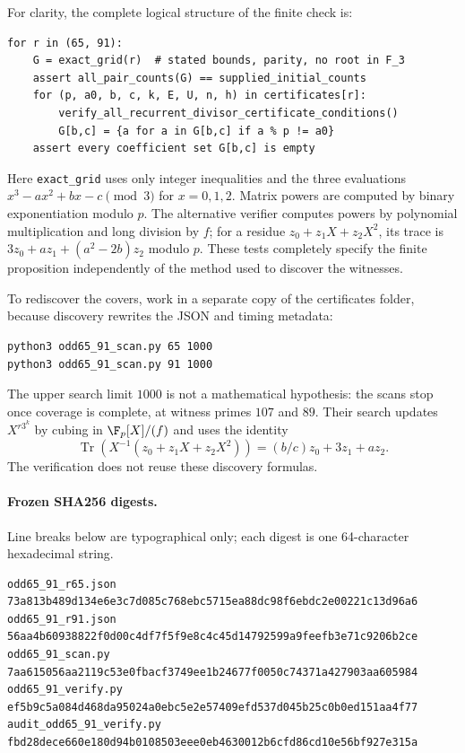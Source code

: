 \documentclass[11pt,a4paper]{article}
\theoremstyle{definition}\newtheorem{definition}[theorem]{Definition}
\theoremstyle{remark}\newtheorem{remark}[theorem]{Remark}
\DeclareMathOperator{\Tr}{Tr}\DeclareMathOperator{\tr}{tr}\DeclareMathOperator{\Nm}{N}
\begin{document}
For clarity, the complete logical structure of the finite check is:
\begin{lstlisting}
for r in (65, 91):
    G = exact_grid(r)  # stated bounds, parity, no root in F_3
    assert all_pair_counts(G) == supplied_initial_counts
    for (p, a0, b, c, k, E, U, n, h) in certificates[r]:
        verify_all_recurrent_divisor_certificate_conditions()
        G[b,c] = {a for a in G[b,c] if a % p != a0}
    assert every coefficient set G[b,c] is empty
\end{lstlisting}
Here \texttt{exact\_grid} uses only integer inequalities and the
three evaluations $x^3-ax^2+bx-c\pmod3$ for $x=0,1,2$.
Matrix powers are computed by binary exponentiation modulo $p$.
The alternative verifier computes powers by polynomial multiplication
and long division by $f$; for a residue $z_0+z_1X+z_2X^2$, its trace is
$3z_0+az_1+(a^2-2b)z_2$ modulo $p$.
These tests completely specify the finite proposition independently
of the method used to discover the witnesses.

To rediscover the covers, work in a separate copy of the certificates
folder, because discovery rewrites the JSON and timing metadata:
\begin{lstlisting}
python3 odd65_91_scan.py 65 1000
python3 odd65_91_scan.py 91 1000
\end{lstlisting}
The upper search limit $1000$ is not a mathematical hypothesis:
the scans stop once coverage is complete, at witness primes $107$
and $89$. Their search updates $X^{r3^k}$ by cubing in
$\F_p[X]/(f)$ and uses the identity
\[
 \Tr\!\left(X^{-1}(z_0+z_1X+z_2X^2)\right)
 =(b/c)z_0+3z_1+az_2.
\]
The verification does not reuse these discovery formulas.

\paragraph{Frozen SHA256 digests.}
Line breaks below are typographical only; each digest is one
64-character hexadecimal string.
\begin{lstlisting}
odd65_91_r65.json
73a813b489d134e6e3c7d085c768ebc5715ea88dc98f6ebdc2e00221c13d96a6
odd65_91_r91.json
56aa4b60938822f0d00c4df7f5f9e8c4c45d14792599a9feefb3e71c9206b2ce
odd65_91_scan.py
7aa615056aa2119c53e0fbacf3749ee1b24677f0050c74371a427903aa605984
odd65_91_verify.py
ef5b9c5a084d468da95024a0ebc5e2e57409efd537d045b25c0b0ed151aa4f77
audit_odd65_91_verify.py
fbd28dece660e180d94b0108503eee0eb4630012b6cfd86cd10e56bf927e315a
\end{lstlisting}
\end{document}
